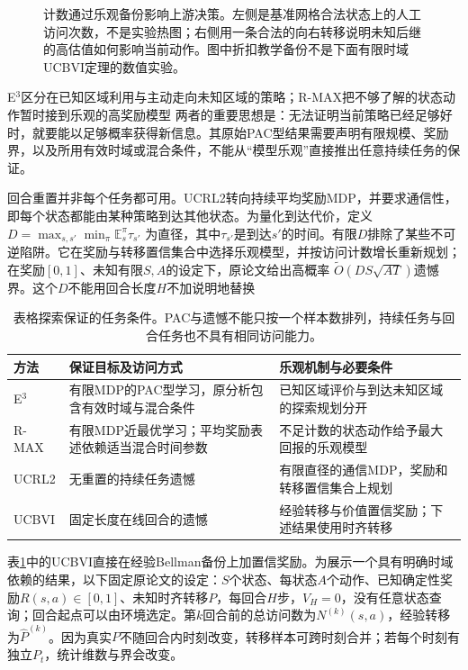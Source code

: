 \begin{figure}[t]
  \centering
  
  \caption{计数通过乐观备份影响上游决策。左侧是基准网格合法状态上的人工访问次数，不是实验热图；右侧用一条合法的向右转移说明未知后继的高估值如何影响当前动作。图中折扣教学备份不是下面有限时域UCBVI定理的数值实验。}
  \label{fig:rl-learning-optimistic-grid}
\end{figure}

E$^3$区分在已知区域利用与主动走向未知区域的策略；R-MAX把不够了解的状态动作暂时接到乐观的高奖励模型
两者的重要思想是：无法证明当前策略已经足够好时，就要能以足够概率获得新信息。其原始PAC型结果需要声明有限规模、奖励界，以及所用有效时域或混合条件，不能从“模型乐观”直接推出任意持续任务的保证。

回合重置并非每个任务都可用。UCRL2转向持续平均奖励MDP，并要求通信性，即每个状态都能由某种策略到达其他状态。为量化到达代价，定义
$D=\max_{s,s'}\min_\pi\mathbb E_s^\pi\tau_{s'}$
为直径，其中$\tau_{s'}$是到达$s'$的时间。有限$D$排除了某些不可逆陷阱。它在奖励与转移置信集合中选择乐观模型，并按访问计数增长重新规划；在奖励$[0,1]$、未知有限$S,A$的设定下，原论文给出高概率
$\widetilde O(DS\sqrt{AT})$遗憾界。这个$D$不能用回合长度$H$不加说明地替换

\begin{table}[t]
  \centering
  \small
  \begin{tabularx}{\linewidth}{>{\raggedright\arraybackslash}p{20mm} >{\raggedright\arraybackslash}X >{\raggedright\arraybackslash}X}
    \toprule
    方法 & 保证目标及访问方式 & 乐观机制与必要条件 \\
    \midrule
    E$^3$ & 有限MDP的PAC型学习，原分析包含有效时域与混合条件 & 已知区域评价与到达未知区域的探索规划分开 \\
    R-MAX & 有限MDP近最优学习；平均奖励表述依赖适当混合时间参数 & 不足计数的状态动作给予最大回报的乐观模型 \\
    UCRL2 & 无重置的持续任务遗憾 & 有限直径的通信MDP，奖励和转移置信集合上规划 \\
    UCBVI & 固定长度在线回合的遗憾 & 经验转移与价值置信奖励；下述结果使用时齐转移 \\
    \bottomrule
  \end{tabularx}
  \caption{表格探索保证的任务条件。PAC与遗憾不能只按一个样本数排列，持续任务与回合任务也不具有相同访问能力。}
  \label{tab:rl-learning-tabular-methods}
\end{table}

表\ref{tab:rl-learning-tabular-methods}中的UCBVI直接在经验Bellman备份上加置信奖励。为展示一个具有明确时域依赖的结果，以下固定原论文的设定：$S$个状态、每状态$A$个动作、已知确定性奖励$R(s,a)\in[0,1]$、未知时齐转移$P$，每回合$H$步，$V_H=0$，没有任意状态查询；回合起点可以由环境选定。第$k$回合前的总访问数为$N^{(k)}(s,a)$，经验转移为$\widehat P^{(k)}$。因为真实$P$不随回合内时刻改变，转移样本可跨时刻合并；若每个时刻有独立$P_t$，统计维数与界会改变。

